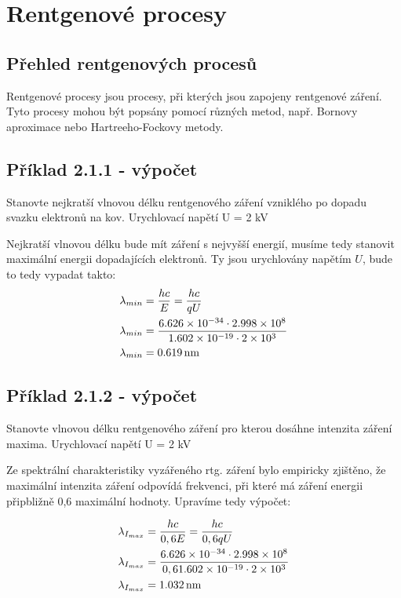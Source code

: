 \section{Rentgenové procesy}

\subsection{Přehled rentgenových procesů}

Rentgenové procesy jsou procesy, při kterých jsou zapojeny rentgenové záření. Tyto procesy mohou být popsány pomocí různých metod, např. Bornovy aproximace nebo Hartreeho-Fockovy metody.

\subsection{Příklad 2.1.1 - výpočet}
\begin{zadani}
    Stanovte nejkratší vlnovou délku rentgenového záření vzniklého 
    po dopadu svazku elektronů na kov. Urychlovací napětí  U = 2 kV
\end{zadani}


Nejkratší vlnovou délku bude mít záření s nejvyšší energií, musíme tedy stanovit maximální energii dopadajících elektronů. Ty jsou urychlovány napětím \(U\), bude to tedy vypadat takto:
\begin{align*}
  \lambda_{min} &=\frac{hc}{E}=\frac{hc}{qU} \\
  \lambda_{min} &=\frac{\num{6.626e-34}\cdot\num{2.998e8}}{\num{1.602e-19}\cdot \num{2e3}}\\
  \lambda_{min} &= \qty{0,619}{nm}
\end{align*}


\subsection{Příklad 2.1.2 - výpočet}
\begin{zadani}
    Stanovte vlnovou délku rentgenového záření pro kterou dosáhne 
    intenzita záření maxima. Urychlovací napětí  U = 2 kV
\end{zadani}


Ze spektrální charakteristiky vyzářeného rtg. záření bylo empiricky zjištěno, že maximální intenzita záření odpovídá frekvenci, při které má záření energii připbližně 0,6 maximální hodnoty. Upravíme tedy výpočet:

\begin{align*}
    \lambda_{I_{max}} &=\frac{hc}{0,6E}=\frac{hc}{0,6qU} \\
    \lambda_{I_{max}} &=\frac{\num{6.626e-34}\cdot\num{2.998e8}}{0,6\num{1.602e-19}\cdot \num{2e3}}\\
    \lambda_{I_{max}} &= \qty{1,032}{nm}
  \end{align*}

